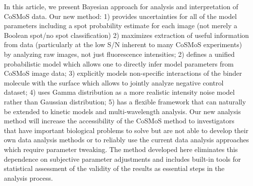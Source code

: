 In this article, we present Bayesian approach for analysis and interpretation of CoSMoS data. Our new method: 1) provides uncertainties for all of the model parameters including a spot probability estimate for each image (not merely a Boolean spot/no spot classification) 2) maximizes extraction of useful information from data (particularly at the low S/N inherent to many CoSMoS experiments) by analyzing raw images, not just fluorescence intensities; 2) defines a unified probabilistic model which allows one to directly infer model parameters from CoSMoS image data; 3) explicitly models non-specific interactions of the binder molecule with the surface which allows to jointly analyze negative control dataset; 4) uses Gamma distribution as a more realistic intensity noise model rather than Gaussian distribution; 5) has a flexible framework that can naturally be extended to kinetic models and multi-wavelength analysis. Our new analysis method will increase the accessibility of the CoSMoS method to investigators that have important biological problems to solve but are not able to develop their own data analysis methods or to reliably use the current data analysis approaches which require parameter tweaking. The method developed here eliminates this dependence on subjective parameter adjustments and includes built-in tools for statistical assessment of the validity of the results as essential steps in the analysis process.